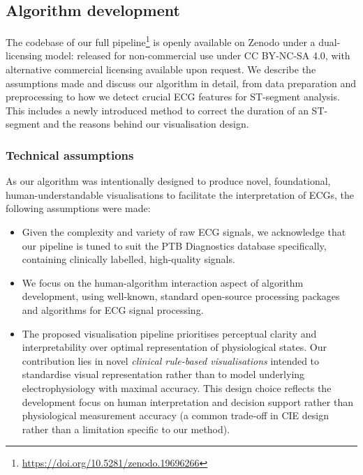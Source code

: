\documentclass[
  10pt,
  letterpaper,
]{article}
\begin{document}
\subsection{Algorithm development}\label{sec-vis-alg-dev}

The codebase of our full
pipeline\footnote{\url{https://doi.org/10.5281/zenodo.19696266}} is
openly available on Zenodo under a dual-licensing model: released for
non-commercial use under CC BY‑NC‑SA 4.0, with alternative commercial
licensing available upon request. We describe the assumptions made and
discuss our algorithm in detail, from data preparation and preprocessing
to how we detect crucial ECG features for ST-segment analysis. This
includes a newly introduced method to correct the duration of an
ST-segment and the reasons behind our visualisation design.

\subsubsection{Technical assumptions}\label{technical-assumptions}

As our algorithm was intentionally designed to produce novel,
foundational, human-understandable visualisations to facilitate the
interpretation of ECGs, the following assumptions were made:

\begin{itemize}
    \item Given the complexity and variety of raw ECG signals, we acknowledge that our pipeline is tuned to suit the PTB Diagnostics database \cite{ptb} specifically, containing clinically labelled, high-quality signals.
    \item We focus on the human-algorithm interaction aspect of algorithm development, using well-known, standard open-source processing packages and algorithms for ECG signal processing.
    \item The proposed visualisation pipeline prioritises perceptual clarity and interpretability over optimal representation of physiological states. Our contribution lies in novel \textit{clinical rule-based visualisations} intended to standardise visual representation rather than to model underlying electrophysiology with maximal accuracy. This design choice reflects the development focus on human interpretation and decision support rather than physiological measurement accuracy (a common trade‑off in CIE design rather than a limitation specific to our method).
\end{itemize}
\end{document}
